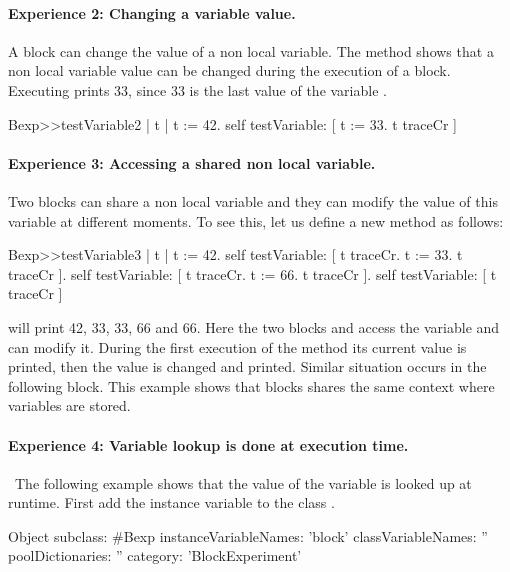 \documentclass[a4paper,10pt,twoside]{book}
\begin{document}
\paragraph{Experience 2: Changing a variable value.} A block can change the value of a non local variable.
The method  shows that a non local variable value can be changed during the execution of a block. Executing  prints 33, since 33 is the last value of the variable .


\begin{code}{}
Bexp>>testVariable2
	| t |
	t := 42.
	self testVariable: [ t := 33. t traceCr ]
\end{code}
\paragraph{Experience 3: Accessing a shared non local variable.}
Two blocks can share a non local variable and they can modify the value of this variable at different moments. To see this, let us define a new method  as follows:

\begin{code}{}
Bexp>>testVariable3
	| t |
	t := 42.
	self testVariable: [ t traceCr. t := 33. t traceCr ].
	self testVariable: [ t traceCr. t := 66. t traceCr ].
	self testVariable: [ t traceCr ]
\end{code}

 will print 42, 33, 33, 66 and 66.
Here the two blocks \ct{[ t := 33. t traceCr ]} and \ct{[ t := 66. t traceCr ]} access the variable  and can modify it. During the first execution of the method  its current value  is printed, then the value is changed and printed. Similar situation occurs in the following block. This example shows that blocks shares the same context where variables are stored.

\paragraph{Experience 4: Variable lookup is done at execution time.}\
The following example shows that the value of the variable is looked up at runtime.
First add the instance variable \ct{block} to the class \ct{Bexp}.

\begin{code}{}
Object subclass: #Bexp
	instanceVariableNames: 'block'
	classVariableNames: ''
	poolDictionaries: ''
	category: 'BlockExperiment'
\end{code}
\end{document}
